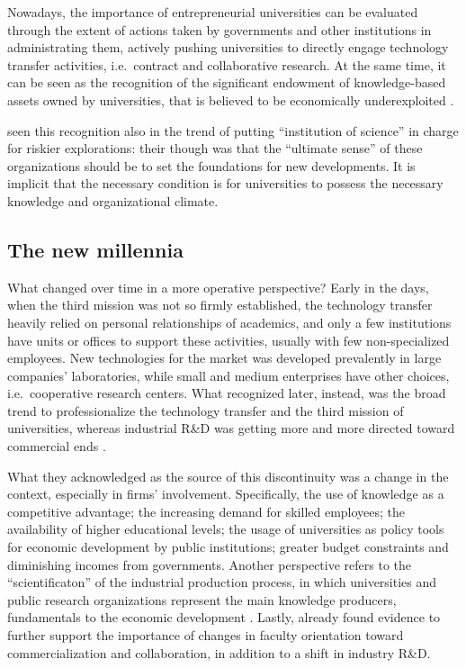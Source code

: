 Nowadays, the importance of entrepreneurial universities can be evaluated through the extent of actions taken by governments and other institutions in administrating them, actively pushing universities to directly engage technology transfer activities, i.e.\ contract and collaborative research. At the same time, it can be seen as the recognition of the significant endowment of knowledge-based assets owned by universities, that is believed to be economically underexploited \citep{Tijssen2006}. 

\citet{Balconi2006} seen this recognition also in the trend of putting \enquote{institution of science} in charge for riskier explorations: their though was that the \enquote{ultimate sense} of these organizations should be to set the foundations for new developments. It is implicit that the necessary condition is for universities to possess the necessary knowledge and organizational climate.

\subsection{The new millennia}

What changed over time in a more operative perspective? Early in the days, when the third mission was not so firmly established, the technology transfer heavily relied on personal relationships of academics, and only a few institutions have units or offices to support these activities, usually with few non-specialized employees. New technologies for the market was developed prevalently in large companies' laboratories, while small and medium enterprises have other choices, i.e.\ cooperative research centers. What \citet{Geuna2009} recognized later, instead, was the broad trend to professionalize the technology transfer and the third mission of universities, whereas industrial R\&D was getting more and more directed toward commercial ends \citep{Fritsch2007}.

What they acknowledged as the source of this discontinuity was a change in the context, especially in firms' involvement. Specifically, the use of knowledge as a competitive advantage; the increasing demand for skilled employees; the availability of higher educational levels; the usage of universities as policy tools for economic development by public institutions; greater budget constraints and diminishing incomes from governments. Another perspective refers to the \enquote{scientificaton} of the industrial production process, in which universities and public research organizations represent the main knowledge producers, fundamentals to the economic development \citep{Balderi2007}. Lastly, already \citet{Thursby2002} found evidence to further support the importance of changes in faculty orientation toward commercialization and collaboration, in addition to a shift in industry R\&D.

